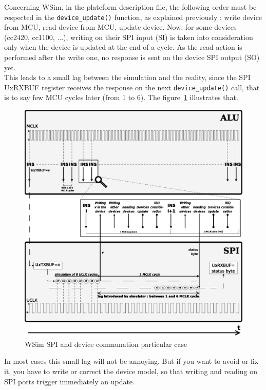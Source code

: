\documentclass[a4paper,10pt]{report}
\begin{document}
Concerning WSim, in the plateform description file, the following order must be respected in the \verb$device_update()$ function, as explained previously : write device from MCU, read device from MCU, update device.
Now, for some devices (cc2420, cc1100, ...), writing on their SPI input (SI) is taken into consideration only when the device is updated at the end of a cycle. As the read action is performed after the write one, no response is sent on the device SPI output (SO) yet.\\

This leads to a small lag between the simulation and the reality, since the SPI UxRXBUF register receives the response on the next \verb$device_update()$ call, that is to say few MCU cycles later (from 1 to 6).
The figure~\ref{wsim spi communication} illustrates that.\\

\begin{figure}[!h]
\begin{center}
  \includegraphics[scale=1]{figures/wsim_spi.eps}
\end{center}
\caption{WSim SPI and device communation particular case}
\label{wsim spi communication}
\end{figure}

In most cases this small lag will not be annoying. But if you want to avoid or fix it, you have to write or correct the device model, so that writing and reading on SPI ports trigger immediately an update.
\end{document}
